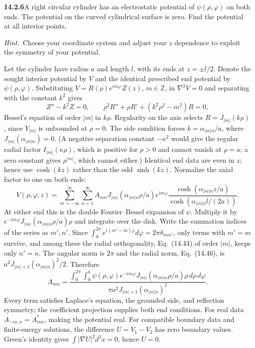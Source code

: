 \par\bigskip
\noindent\textbf{14.2.6}\quad A right circular cylinder has an
electrostatic potential of $\psi(\rho,\varphi)$ on both ends. The
potential on the curved cylindrical surface is zero. Find the
potential at all interior points.
\par\emph{Hint.}~Choose your coordinate system and adjust your $z$
dependence to exploit the symmetry of your potential.
\par{}
\solution
Let the cylinder have radius $a$ and length $l$, with its ends
at $z=\pm l/2$. Denote the sought interior potential by $V$ and
the identical prescribed end potential by $\psi(\rho,\varphi)$.
Substituting $V=R(\rho)e^{im\varphi}Z(z)$, $m\in\mathbb Z$, in
$\nabla^2V=0$ and separating with the constant $k^2$ gives
\[
Z''-k^2Z=0,\qquad \rho^2R''+\rho R'+(k^2\rho^2-m^2)R=0,
\]
Bessel's equation of order $|m|$ in $k\rho$. Regularity on the axis
selects $R=J_{|m|}(k\rho)$, since $Y_{|m|}$ is unbounded at
$\rho=0$. The side condition forces
$k=\alpha_{|m|n}/a$, where $J_{|m|}(\alpha_{|m|n})=0$. (A negative
separation constant $-\kappa^2$ would give the regular radial factor
$I_{|m|}(\kappa\rho)$, which is positive for $\rho>0$ and cannot
vanish at $\rho=a$; a zero constant gives $\rho^{|m|}$, which
cannot either.)
Identical end data are even in $z$; hence use $\cosh(kz)$ rather
than the odd $\sinh(kz)$. Normalize the axial factor to one on
both ends:
\[
\boxed{V(\rho,\varphi,z)=\sum_{m=-\infty}^{\infty}
\sum_{n=1}^{\infty}A_{mn}J_{|m|}(\alpha_{|m|n}\rho/a)
e^{im\varphi}
\frac{\cosh(\alpha_{|m|n}z/a)}
{\cosh(\alpha_{|m|n}l/(2a))}}.
\]
At either end this is the double Fourier--Bessel expansion of
$\psi$. Multiply it by
$e^{-im\varphi}J_{|m|}(\alpha_{|m|n}\rho/a)\rho$ and integrate
over the disk. Write the summation indices of the series as $m',n'$.
Since $\int_0^{2\pi}e^{i(m'-m)\varphi}d\varphi
=2\pi\delta_{mm'}$, only terms with $m'=m$ survive, and among these
the radial orthogonality, Eq.~(14.44) of order $|m|$, keeps only
$n'=n$. The angular norm is $2\pi$ and the radial norm, Eq.~(14.46),
is $a^2J_{|m|+1}(\alpha_{|m|n})^2/2$. Therefore
\[
\boxed{A_{mn}=\frac{\displaystyle\int_0^{2\pi}\!\int_0^a
\psi(\rho,\varphi)e^{-im\varphi}
J_{|m|}(\alpha_{|m|n}\rho/a)\rho\,d\rho\,d\varphi}
{\pi a^2J_{|m|+1}(\alpha_{|m|n})^2}}.
\]
Every term satisfies Laplace's equation, the grounded side, and
reflection symmetry; the coefficient projection supplies both end
conditions. For real data $A_{-m,n}=A_{mn}^*$, making the potential
real. For compatible boundary data and finite-energy solutions,
the difference $U=V_1-V_2$ has zero boundary values. Green's
identity gives $\int|\nabla U|^2d^3x=0$, hence $U=0$.

